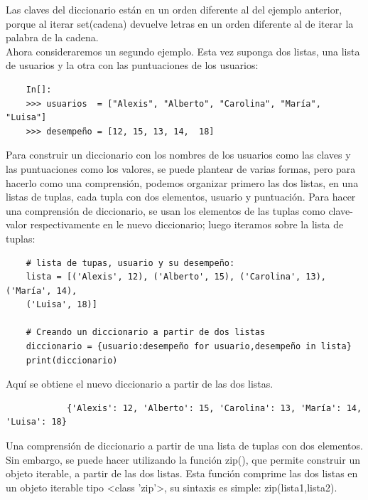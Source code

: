 Las claves del diccionario están en un orden diferente al del ejemplo anterior, porque al iterar
{\ttfamily set(cadena)} devuelve letras en un orden diferente al de iterar la palabra de la cadena.\\



Ahora consideraremos un segundo ejemplo. Esta  vez suponga dos listas, una lista de usuarios y la otra con las puntuaciones de los usuarios:
\begin{lstlisting}
	In[]:		
	>>> usuarios  = ["Alexis", "Alberto", "Carolina", "María", "Luisa"]
	>>> desempeño = [12, 15, 13, 14,  18]
\end{lstlisting}

Para construir un diccionario con los nombres de los usuarios como las claves y las puntuaciones como los valores, se puede plantear de varias formas, pero para hacerlo como una comprensión, podemos organizar primero las dos listas, en una listas de tuplas, cada tupla con dos elementos, usuario y puntuación. 
Para hacer una comprensión de diccionario, se usan los elementos de las tuplas como clave-valor respectivamente en le nuevo diccionario; luego iteramos sobre la lista de tuplas: 

\hspace{-2.5cm}{\ttfamily \scriptsize usuario.py}  \vspace{-0.5cm}
\begin{lstlisting}	
	# lista de tupas, usuario y su desempeño:
	lista = [('Alexis', 12), ('Alberto', 15), ('Carolina', 13), ('María', 14), 
	('Luisa', 18)]	
	
	# Creando un diccionario a partir de dos listas
	diccionario = {usuario:desempeño for usuario,desempeño in lista}
	print(diccionario)
\end{lstlisting}	

Aquí se obtiene el nuevo diccionario a partir de las dos listas. 

{\ttfamily\scriptsize\scriptsize 
	\hspace{-0.65cm} \vspace{-0.3cm}	
	{\color{blue} 	
		\begin{verbatim}
			{'Alexis': 12, 'Alberto': 15, 'Carolina': 13, 'María': 14, 'Luisa': 18}	
		\end{verbatim}
}}
\noindent Una comprensión de diccionario a partir de una lista de tuplas con dos elementos.\\  

Sin embargo,  se puede hacer utilizando la función {\ttfamily zip()}, que permite construir un objeto iterable, a partir de las dos listas. Esta función comprime las dos listas en un objeto iterable tipo {\ttfamily <{}class '{}zip{}'{}>{}}, su sintaxis es simple: {\ttfamily zip(lista1,lista2)}. 

